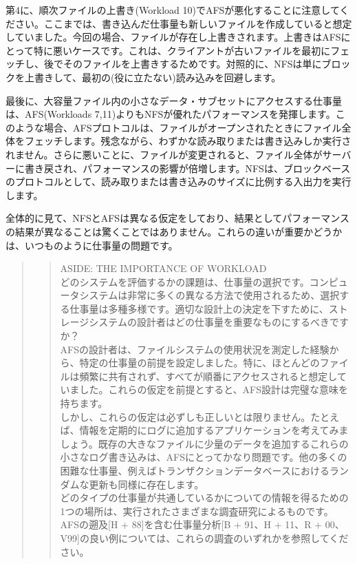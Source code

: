 第4に、順次ファイルの上書き(Workload
10)でAFSが悪化することに注意してください。ここまでは、書き込んだ仕事量も新しいファイルを作成していると想定していました。今回の場合、ファイルが存在し上書きされます。上書きはAFSにとって特に悪いケースです。これは、クライアントが古いファイルを最初にフェッチし、後でそのファイルを上書きするためです。対照的に、NFSは単にブロックを上書きして、最初の(役に立たない)読み込みを回避します。

最後に、大容量ファイル内の小さなデータ・サブセットにアクセスする仕事量は、AFS(Workloads
7,11)よりもNFSが優れたパフォーマンスを発揮します。このような場合、AFSプロトコルは、ファイルがオープンされたときにファイル全体をフェッチします。残念ながら、わずかな読み取りまたは書き込みしか実行されません。さらに悪いことに、ファイルが変更されると、ファイル全体がサーバーに書き戻され、パフォーマンスの影響が倍増します。NFSは、ブロックベースのプロトコルとして、読み取りまたは書き込みのサイズに比例する入出力を実行します。

全体的に見て、NFSとAFSは異なる仮定をしており、結果としてパフォーマンスの結果が異なることは驚くことではありません。これらの違いが重要かどうかは、いつものように仕事量の問題です。

\begin{quote}
\begin{quote}
ASIDE: THE IMPORTANCE OF WORKLOAD\\
どのシステムを評価するかの課題は、仕事量の選択です。コンピュータシステムは非常に多くの異なる方法で使用されるため、選択する仕事量は多種多様です。適切な設計上の決定を下すために、ストレージシステムの設計者はどの仕事量を重要なものにするべきですか？\\
AFSの設計者は、ファイルシステムの使用状況を測定した経験から、特定の仕事量の前提を設定しました。特に、ほとんどのファイルは頻繁に共有されず、すべてが順番にアクセスされると想定していました。これらの仮定を前提とすると、AFS設計は完璧な意味を持ちます。\\
しかし、これらの仮定は必ずしも正しいとは限りません。たとえば、情報を定期的にログに追加するアプリケーションを考えてみましょう。既存の大きなファイルに少量のデータを追加するこれらの小さなログ書き込みは、AFSにとってかなり問題です。他の多くの困難な仕事量、例えばトランザクションデータベースにおけるランダムな更新も同様に存在します。\\
どのタイプの仕事量が共通しているかについての情報を得るための1つの場所は、実行されたさまざまな調査研究によるものです。AFSの遡及{[}H
+ 88{]}を含む仕事量分析{[}B + 91、H + 11、R +
00、V99{]}の良い例については、これらの調査のいずれかを参照してください。
\end{quote}
\end{quote}

